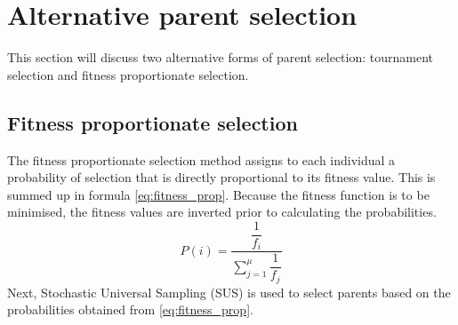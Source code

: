 

\section{Alternative parent selection}
 This section will discuss two alternative forms of parent selection: tournament selection and fitness proportionate selection. 
 
 \subsection{Fitness proportionate selection}
 The fitness proportionate selection method assigns to each individual a probability of selection that is directly proportional to its fitness value. This is summed up in formula \ref{eq:fitness_prop}. Because the fitness function is to be minimised, the fitness values are inverted prior to calculating the probabilities. 
 \begin{equation} \label{eq:fitness_prop}
 P(i) = \dfrac{\dfrac{1}{f_i}}{\sum\limits_{j=1}^\mu {\dfrac{1}{f_j}}}
 \end{equation}
 Next, Stochastic Universal Sampling (SUS) is used to select parents based on the probabilities obtained from \ref{eq:fitness_prop}.
 
